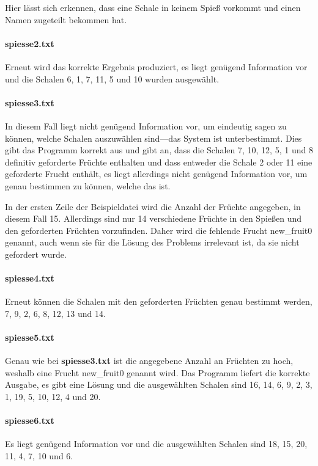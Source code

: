 \documentclass[a4paper,10pt,ngerman]{scrartcl}
\begin{document}
Hier lässt sich erkennen, dass eine Schale in keinem Spieß vorkommt und einen Namen zugeteilt bekommen hat.

\paragraph{spiesse2.txt}
Erneut wird das korrekte Ergebnis produziert, es liegt genügend Information vor und die Schalen 6, 1, 7, 11, 5 und 10 wurden ausgewählt.

\paragraph{spiesse3.txt}
In diesem Fall liegt nicht genügend Information vor, um eindeutig sagen zu können, welche Schalen auszuwählen sind---das System ist unterbestimmt.
Dies gibt das Programm korrekt aus und gibt an, dass die Schalen 7, 10, 12, 5, 1 und 8 definitiv geforderte Früchte enthalten und dass entweder die Schale 2 oder 11 eine geforderte Frucht enthält, es liegt allerdings nicht genügend Information vor, um genau bestimmen zu können, welche das ist.

In der ersten Zeile der Beispieldatei wird die Anzahl der Früchte angegeben, in diesem Fall 15.
Allerdings sind nur 14 verschiedene Früchte in den Spießen und den geforderten Früchten vorzufinden.
Daher wird die fehlende Frucht new\_fruit0 genannt, auch wenn sie für die Lösung des Problems irrelevant ist, da sie nicht gefordert wurde.

\paragraph{spiesse4.txt}
Erneut können die Schalen mit den geforderten Früchten genau bestimmt werden, 7, 9, 2, 6, 8, 12, 13 und 14.

\paragraph{spiesse5.txt}
Genau wie bei \textbf{spiesse3.txt} ist die angegebene Anzahl an Früchten zu hoch, weshalb eine Frucht new\_fruit0 genannt wird.
Das Programm liefert die korrekte Ausgabe, es gibt eine Lösung und die ausgewählten Schalen sind 16, 14, 6, 9, 2, 3, 1, 19, 5, 10, 12, 4 und 20.

\paragraph{spiesse6.txt}
Es liegt genügend Information vor und die ausgewählten Schalen sind 18, 15, 20, 11, 4, 7, 10 und 6.
\end{document}
